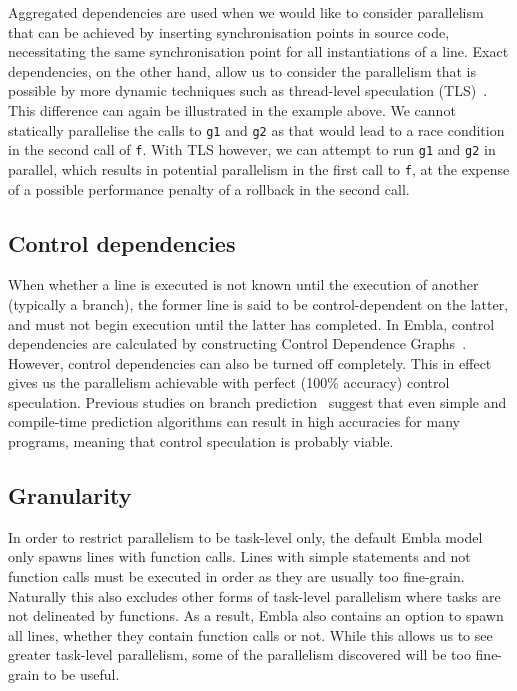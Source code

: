 Aggregated dependencies are used when we would like to consider parallelism that can be achieved by inserting synchronisation points in source code, necessitating the same synchronisation point for all instantiations of a line.
Exact dependencies, on the other hand, allow us to consider the parallelism that is possible by more dynamic techniques such as thread-level speculation (TLS)~\cite{Rundberg01anall-software,gregory05stampede, welc05safe}.
This difference can again be illustrated in the example above.
We cannot statically parallelise the calls to \texttt{g1} and \texttt{g2} as that would lead to a race condition in the second call of \texttt{f}.
With TLS however, we can attempt to run \texttt{g1} and \texttt{g2} in parallel, which results in potential parallelism in the first call to \texttt{f}, at the expense of a possible performance penalty of a rollback in the second call.

\subsection{Control dependencies}
When whether a line is executed is not known until the execution of another (typically a branch), the former line is said to be control-dependent on the latter, and must not begin execution until the latter has completed.
In Embla, control dependencies are calculated by constructing Control Dependence Graphs~\cite{ferrante87program}.
However, control dependencies can also be turned off completely.
This in effect gives us the parallelism achievable with perfect (100\% accuracy) control speculation.
Previous studies on branch prediction~\cite{smith98study} suggest that even simple and compile-time prediction algorithms can result in high accuracies for many programs, meaning that control speculation is probably viable.

\subsection{Granularity}
In order to restrict parallelism to be task-level only, the default Embla model only spawns lines with function calls.
Lines with simple statements and not function calls must be executed in order as they are usually too fine-grain.
Naturally this also excludes other forms of task-level parallelism where tasks are not delineated by functions.
As a result, Embla also contains an option to spawn all lines, whether they contain function calls or not.
While this allows us to see greater task-level parallelism, some of the parallelism discovered will be too fine-grain to be useful.

